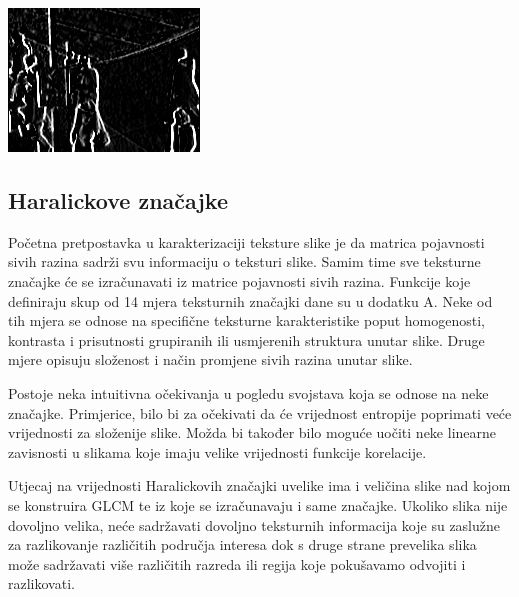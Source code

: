 \documentclass[times, utf8, zavrsni, numeric]{fer}
\begin{document}
\begin{multicols}{2}
\begin{minipage}{\linewidth}
\centering
\includegraphics[width=0.8\linewidth]{img/sobelx.jpg}
\end{minipage}

\end{multicols}

\newpage

\subsection{Haralickove značajke}

Početna pretpostavka u karakterizaciji teksture slike je da 
matrica pojavnosti sivih razina sadrži svu  informaciju o teksturi slike. 
Samim time sve teksturne značajke će se izračunavati iz matrice pojavnosti sivih 
razina. Funkcije koje definiraju skup od 14 mjera teksturnih značajki dane su u dodatku A. 
Neke od tih mjera se odnose na specifične teksturne karakteristike poput homogenosti, 
kontrasta i prisutnosti grupiranih ili usmjerenih struktura unutar slike. Druge mjere 
opisuju složenost i način promjene sivih razina unutar slike.

\bigbreak

Postoje neka intuitivna očekivanja u pogledu svojstava koja se odnose na neke značajke.
Primjerice, bilo bi za očekivati da će vrijednost entropije poprimati veće vrijednosti za složenije slike. 
Možda bi također bilo moguće uočiti neke linearne zavisnosti u slikama koje imaju velike 
vrijednosti funkcije korelacije.

\bigbreak

Utjecaj na vrijednosti Haralickovih značajki uvelike ima i veličina slike nad kojom se konstruira
GLCM te iz koje se izračunavaju i same značajke. Ukoliko slika nije dovoljno velika, neće sadržavati
dovoljno teksturnih informacija koje su zaslužne za razlikovanje različitih područja interesa dok s druge
strane prevelika slika može sadržavati više različitih razreda ili regija koje pokušavamo odvojiti i razlikovati.
\end{document}
